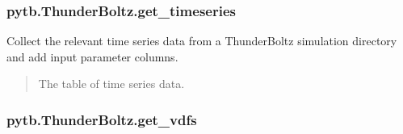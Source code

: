 \documentclass[letterpaper,10pt,english,openany,oneside]{sphinxmanual}
\begin{document}
\begin{fulllineitems}
\begin{fulllineitems}
\end{fulllineitems}


\sphinxstepscope


\subsubsection{pytb.ThunderBoltz.get\_timeseries}
\label{\detokenize{api/pytb.ThunderBoltz.get_timeseries:pytb-thunderboltz-get-timeseries}}\label{\detokenize{api/pytb.ThunderBoltz.get_timeseries::doc}}

\begin{fulllineitems}
\label{\detokenize{api/pytb.ThunderBoltz.get_timeseries:pytb.ThunderBoltz.get_timeseries}}
\pysigstartsignatures
{}
\pysigstopsignatures
\sphinxAtStartPar
Collect the relevant time series data from a ThunderBoltz simulation
directory and add input parameter columns.
\begin{quote}\begin{description}
\sphinxAtStartPar
The table of time series data.

\sphinxAtStartPar
{}

\end{description}\end{quote}

\end{fulllineitems}


\sphinxstepscope


\subsubsection{pytb.ThunderBoltz.get\_vdfs}
\label{\detokenize{api/pytb.ThunderBoltz.get_vdfs:pytb-thunderboltz-get-vdfs}}\label{\detokenize{api/pytb.ThunderBoltz.get_vdfs::doc}}


\end{fulllineitems}
\end{document}
